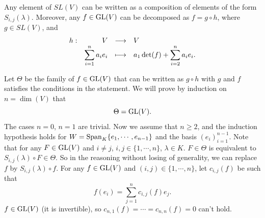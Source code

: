 \begin{lemmaenv}\label{lem:5.6.7}
    Any element of $SL(V)$ can be written as a composition of elements of the form $S_{i,j}(\lambda)$.
    Moreover, any $f \in \operatorname{\mathrm{GL}}(V)$ can be decomposed as $f = g \circ h$,
    where $g \in SL(V)$, and
    $$\begin{array}{rrcl}
        h : & V & \longrightarrow & V\\
        & \displaystyle \sum_{i=1}^n a_i e_i & \longmapsto & \displaystyle a_1 \det (f) + \sum_{i=2}^n a_i e_i.
    \end{array}$$
\end{lemmaenv}
\begin{proofenv}
    Let $\Theta$ be the family of $f \in \operatorname{\mathrm{GL}}(V)$ that can be written as $g \circ h$ with $g$ and $f$ satisfies the conditions in the statement.
    We will prove by induction on $n = \dim (V)$ that
    $$\Theta = \operatorname{\mathrm{GL}}(V).$$
    The cases $n = 0$, $n = 1$ are trivial.
    Now we assume that $n \ge 2$, and the induction hypothesis holds for $W = \operatorname{\mathrm{Span}}_{K}\{e_1,\cdots,e_{n-1}\}$
    and the basis $(e_i)_{i=1}^{n-1}$.
    Note that for any $F \in \operatorname{\mathrm{GL}}(V)$ and $i\neq j$, $i,j \in \{1,\cdots,n\}$, $\lambda \in K$.
    $F \in \Theta$ is equivalent to $S_{i,j}(\lambda) \circ F \in \Theta$.
    So in the reasoning without losing of generality,
    we can replace $f$ by $S_{i,j}(\lambda) \circ f$.
    For any $f \in \operatorname{\mathrm{GL}}(V)$ and $(i,j) \in \{1,\cdots,n\}$, let $c_{i,j}(f)$ be such that
    $$f(e_i) = \sum_{j=1}^{n} c_{i,j}(f) e_j.$$
    $f \in \operatorname{\mathrm{GL}}(V)$ (it is invertible), so $c_{n,1}(f) = \cdots = c_{n,n}(f) = 0$ can't hold.
    

\end{proofenv}
